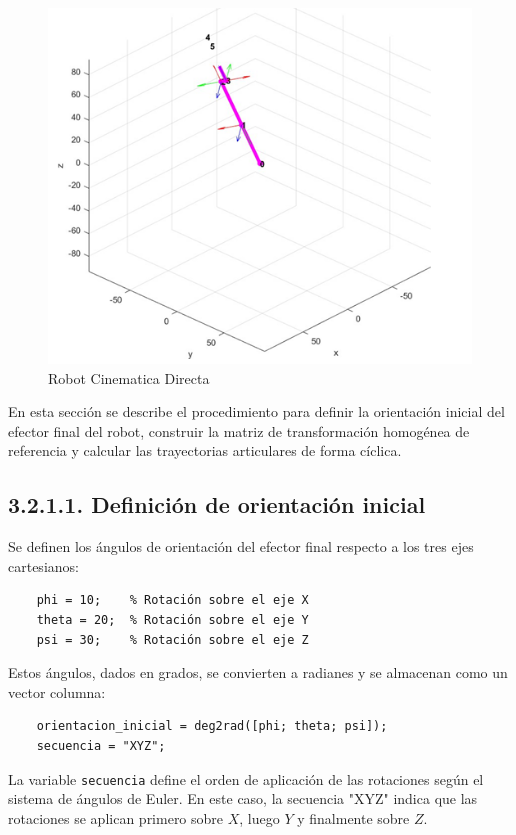 \begin{figure} [h]
	\centering
	\includegraphics[width=0.7\linewidth]{img/robotcindir}
	\caption{Robot Cinematica Directa}
	\label{fig:robotcindir}
\end{figure}

En esta sección se describe el procedimiento para definir la orientación inicial del efector final del robot, construir la matriz de transformación homogénea de referencia y calcular las trayectorias articulares de forma cíclica.

\subsection*{3.2.1.1. Definición de orientación inicial}

Se definen los ángulos de orientación del efector final respecto a los tres ejes cartesianos:

\begin{verbatim}
	phi = 10;    % Rotación sobre el eje X
	theta = 20;  % Rotación sobre el eje Y
	psi = 30;    % Rotación sobre el eje Z
\end{verbatim}

Estos ángulos, dados en grados, se convierten a radianes y se almacenan como un vector columna:

\begin{verbatim}
	orientacion_inicial = deg2rad([phi; theta; psi]);
	secuencia = "XYZ";
\end{verbatim}

La variable \texttt{secuencia} define el orden de aplicación de las rotaciones según el sistema de ángulos de Euler. En este caso, la secuencia "XYZ" indica que las rotaciones se aplican primero sobre \(X\), luego \(Y\) y finalmente sobre \(Z\).

